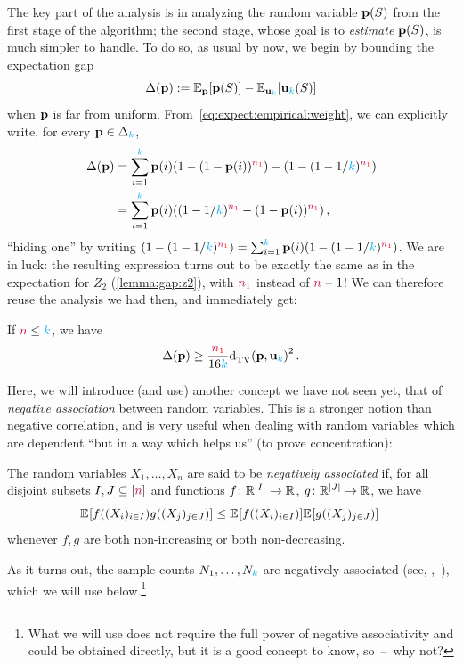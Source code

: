The key part of the analysis is in analyzing the random variable $\mathbf{p}(S)$ from the first stage of the algorithm; the second stage, whose goal is to \emph{estimate} $\mathbf{p}(S)$, is much simpler to handle. To do so, as usual by now, we begin by bounding the expectation gap
\begin{equation}
    \Delta(\p) \eqdef \bE{\p}{\p(S)} - \bE{\uniform_\ab}{\uniform_\ab(S)}
\end{equation}
when $\mathbf{p}$ is far from uniform. From~\cref{eq:expect:empirical:weight}, we can explicitly write, for every $\mathbf{p}\in\Delta_{{\textcolor{cyan}{k}}}$,
\begin{align*}
  \Delta(\p) 
  &= \sum_{i=1}^\ab \p(i) (1-(1-\p(i))^{\nss}) - \Paren{1-(1-1/\ab)^{\nss}} \\
  &= \sum_{i=1}^\ab \p(i) \Paren{ (1-1/\ab)^{\nss} - (1-\p(i))^{\nss} }\,,
\end{align*}
``hiding one'' by writing $\Paren{1-(1-1/\ab)^{\nss}} = \sum_{i=1}^\ab \p(i)\Paren{1-(1-1/\ab)^{\nss}}$. We are in luck: the resulting expression turns out to be exactly the same as in the expectation for $Z_2$ (\cref{lemma:gap:z2}), with $\textcolor{red}{{\textcolor{purple}{n}}_1}$ instead of ${\textcolor{purple}{n}}-1$! We can therefore reuse the analysis we had then, and immediately get:
\begin{lemma}
  \label{lemma:gap:z7}
If ${\textcolor{purple}{n}} \leq {\textcolor{cyan}{k}}$, we have
\[
    \Delta(\p) \geq \frac{\nss}{16\ab}\totalvardist{\p}{\uniform_\ab}^2\,.
\]
\end{lemma}
Here, we will introduce (and use) another concept we have not seen yet, that of \emph{negative association} between random variables. This is a stronger notion than negative correlation, and is very useful when dealing with random variables which are dependent ``but in a way which helps us'' (to prove concentration):
\begin{definition}
The random variables $X_1,\dots, X_n$ are said to be \emph{negatively associated} if, for all disjoint subsets $I,J\subseteq [{\textcolor{purple}{n}}]$ and functions $f\colon \mathbb{R}^{|I|} \to \mathbb{R}$, $g\colon \mathbb{R}^{|J|} \to \mathbb{R}$, we have
\[
    \bEE{f((X_i)_{i\in I})g((X_j)_{j\in J})} \leq \bEE{f((X_i)_{i\in I})}\bEE{g((X_j)_{j\in J})} \
\]
whenever $f,g$ are both non-increasing or both non-decreasing. 
\end{definition}
As it turns out, the sample counts $N_1,\dots,N_{\textcolor{cyan}{k}}$ are negatively associated (see, \eg,~\citep[Section~2.2]{DubhashiR98}), which we will use below.\footnote{What we will use does not require the full power of negative associativity and could be obtained directly, but it is a good concept to know, so~--~why not?} 
